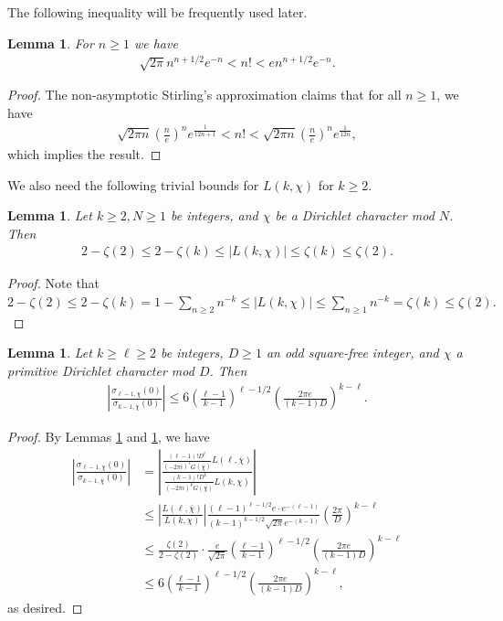 \documentclass[11pt,letterpaper,reqno]{amsart}
\numberwithin{figure}{section}
\numberwithin{table}{section}
\theoremstyle{definition}
\theoremstyle{plain}
\newtheorem{lemma}[theorem]{Lemma}
\theoremstyle{definition}
\theoremstyle{definition}
\theoremstyle{remark}
\numberwithin{equation}{section}
\theoremstyle{remark}
\begin{document}
The following inequality will be frequently used later.  
\begin{lemma}\label{lem:stirling}
    For $n\geq1$ we have 
    \begin{align*}
        \sqrt{2\pi}n^{n+1/2}e^{-n}<n!<en^{n+1/2}e^{-n}.
    \end{align*}
\end{lemma}
\begin{proof}
  The non-asymptotic Stirling's approximation \cite{Stirling's-formula} claims that for all $n\geq1$, we have 
\begin{align*} 
    \sqrt{2\pi n}\left(\frac{n}{e}\right)^ne^{\frac{1}{12n+1}}<n!<   \sqrt{2\pi n}\left(\frac{n}{e}\right)^ne^{\frac{1}{12n}},
\end{align*}
which implies the result.
\end{proof}
We also need the following trivial bounds for $L(k,\chi)$ for $k\geq2$.
\begin{lemma}\label{lem:boundforL}
    Let $k\geq2, N\geq1$ be integers, and $\chi$ be a Dirichlet character mod $N$. Then
    \begin{align*}
        2-\zeta(2)\leq2-\zeta(k)\leq|L(k,\chi)|\leq\zeta(k)\leq\zeta(2).
    \end{align*}
\end{lemma}
\begin{proof}
     Note that 
    $2-\zeta(2)\leq2-\zeta(k)=1-\sum_{n\geq2}n^{-k}\leq|L(k,\chi)|\leq \sum_{n\geq1}n^{-k}=\zeta(k)\leq\zeta(2).$
\end{proof}
\begin{lemma}\label{lem:bdquotientLvalues}
    Let $k\geq\ell\geq2$ be integers, $D\geq1$ an odd square-free integer, and $\chi$  a primitive Dirichlet character mod $D$. Then
   \begin{align*}
        \left|\frac{\sigma_{\ell-1,\chi}(0)}{\sigma_{k-1,\overline{\chi}}(0)}\right|\leq 6\left(\frac{\ell-1}{k-1}\right)^{\ell-1/2}\left(\frac{2\pi e}{(k-1)D}\right)^{k-\ell}.
         \end{align*}
\end{lemma}
\begin{proof}
By Lemmas \ref{lem:stirling} and \ref{lem:boundforL}, we have
\begin{align*}
    \left|\frac{\sigma_{\ell-1,\chi}(0)}{\sigma_{k-1,\overline{\chi}}(0)}\right|&=
    \left|\frac{\frac{(\ell-1)!D^{\ell}}{(-2\pi i)^{\ell}G(\overline{\chi})}L(\ell,\overline{\chi})}{\frac{(k-1)!D^k}{(-2\pi i)^kG(\chi)}L(k,\chi)}\right|
    \\&\leq\left|\frac{L(\ell,\overline{\chi})}{L(k,\chi)}\right|\frac{(\ell-1)^{\ell-1/2}e\cdot e^{-(\ell-1)}}{(k-1)^{k-1/2}\sqrt{2\pi}e^{-(k-1)}}\left(\frac{2\pi}{D}\right)^{k-\ell}\\&\leq\frac{\zeta(2)}{2-\zeta(2)}\cdot\frac{e}{\sqrt{2\pi}}\left(\frac{\ell-1}{k-1}\right)^{\ell-1/2}\left(\frac{2\pi e}{(k-1)D}\right)^{k-\ell}\\&\leq6\left(\frac{\ell-1}{k-1}\right)^{\ell-1/2}\left(\frac{2\pi e}{(k-1)D}\right)^{k-\ell},
\end{align*}
as desired.
\end{proof}
\end{document}
